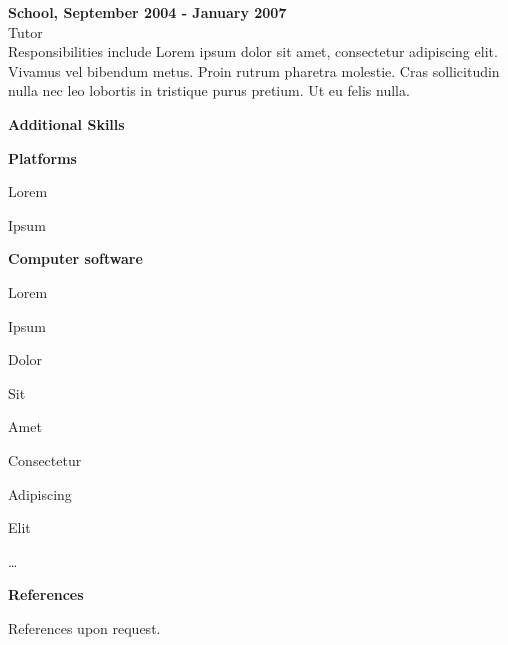\documentclass[a4paper,11pt,final]{memoir}
\newcommand{\Sep}{\vspace{1.5em}}
\newcommand{\SmallSep}{\vspace{0.5em}}
\newcommand{\CVSection}[1]
    {\Large\textbf{#1}\par
    \SmallSep\normalsize\normalfont}
\newcommand{\CVItem}[1]
    {\textbf{\color{RoyalBlue} #1}}
\begin{document}
\CVItem{School, September 2004 - January 2007}\\
Tutor \SmallSep \\
Responsibilities include Lorem ipsum dolor sit amet, consectetur adipiscing elit. Vivamus vel bibendum metus. Proin rutrum pharetra molestie. Cras sollicitudin nulla nec leo lobortis in tristique purus pretium. Ut eu felis nulla.
\SmallSep



\CVSection{Additional Skills}
\CVItem{Platforms}
\begin{multicols}{3}
\begin{compactitem}[\color{RoyalBlue}$\circ$]
    \item Lorem 
    \item Ipsum 
\end{compactitem}
\end{multicols}
\SmallSep

\CVItem{Computer software}
\begin{multicols}{3}
\begin{compactitem}[\color{RoyalBlue}$\circ$]
    \item Lorem 
    \item Ipsum 
    \item Dolor 
    \item Sit 
    \item Amet
    \item Consectetur 
    \item Adipiscing 
    \item Elit
    \item \ldots
\end{compactitem}
\end{multicols}
\Sep 

\CVSection{References}
References upon request.

\end{document}
